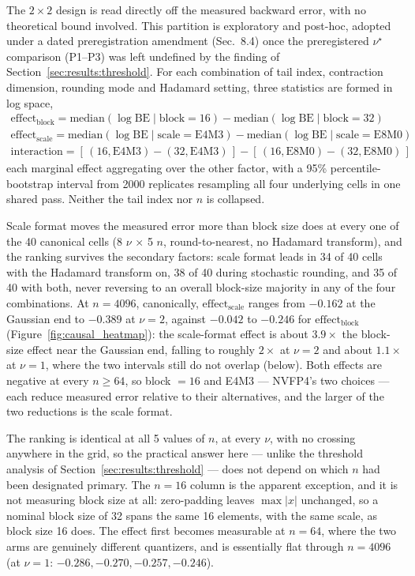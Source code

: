 The $2\times2$ design is read directly off the measured backward error, with no
theoretical bound involved. This partition is exploratory and post-hoc, adopted
under a dated preregistration amendment (Sec.\ 8.4) once the preregistered
$\nu^\star$ comparison (P1--P3) was left undefined by the finding of
Section~\ref{sec:results:threshold}. For each combination of tail
index, contraction dimension, rounding mode and Hadamard setting, three
statistics are formed in log space,
\[
\begin{array}{l}
  \mathrm{effect}_{\mathrm{block}} = \mathrm{median}(\log \mathrm{BE} \mid \mathrm{block}{=}16) - \mathrm{median}(\log \mathrm{BE} \mid \mathrm{block}{=}32) \\[3pt]
  \mathrm{effect}_{\mathrm{scale}} = \mathrm{median}(\log \mathrm{BE} \mid \mathrm{scale}{=}\mathrm{E4M3}) - \mathrm{median}(\log \mathrm{BE} \mid \mathrm{scale}{=}\mathrm{E8M0}) \\[3pt]
  \mathrm{interaction} = [\,(16,\mathrm{E4M3}) - (32,\mathrm{E4M3})\,] - [\,(16,\mathrm{E8M0}) - (32,\mathrm{E8M0})\,]
\end{array}
\]
each marginal effect aggregating over the other factor, with a 95\%
percentile-bootstrap interval from 2000 replicates resampling all four underlying
cells in one shared pass. Neither the tail index nor $n$ is collapsed.

Scale format moves the measured error more than block size does at every one of
the 40 canonical cells (8 $\nu$ $\times$ 5 $n$, round-to-nearest, no Hadamard
transform), and the ranking survives the secondary factors: scale format leads in
34 of 40 cells with the Hadamard transform on, 38 of 40 during stochastic
rounding, and 35 of 40 with both, never reversing to an overall block-size
majority in any of the four combinations. At $n = 4096$, canonically,
$\mathrm{effect}_{\mathrm{scale}}$ ranges from $-0.162$ at the Gaussian end to
$-0.389$ at $\nu = 2$, against $-0.042$ to $-0.246$ for
$\mathrm{effect}_{\mathrm{block}}$ (Figure~\ref{fig:causal_heatmap}): the
scale-format effect is about $3.9\times$ the block-size effect near the Gaussian
end, falling to roughly $2\times$ at $\nu = 2$ and about $1.1\times$ at
$\nu = 1$, where the two intervals still do not overlap (below). Both effects are negative at every
$n \ge 64$, so block $= 16$ and E4M3 --- NVFP4's two choices --- each reduce
measured error relative to their alternatives, and the larger of the two
reductions is the scale format.

The ranking is identical at all 5 values of $n$, at every $\nu$, with no crossing
anywhere in the grid, so the practical answer here --- unlike the threshold
analysis of Section~\ref{sec:results:threshold} --- does not depend on which $n$
had been designated primary. The $n = 16$ column is the apparent exception, and
it is not measuring block size at all: zero-padding leaves $\max|x|$ unchanged,
so a nominal block size of 32 spans the same 16 elements, with the same scale, as
block size 16 does. The effect first becomes measurable at $n = 64$, where the
two arms are genuinely different quantizers, and is essentially flat through
$n = 4096$ (at $\nu = 1$: $-0.286, -0.270, -0.257, -0.246$).

